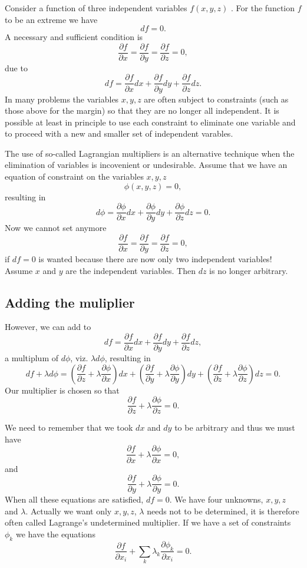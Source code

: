 \documentclass[%
oneside,                 %
final,                   %
10pt]{article}
\begin{document}
Consider a function of three independent variables $f(x,y,z)$ . For the function $f$ to be an
extreme we have
\[
df=0.
\]
A necessary and sufficient condition is
\[
\frac{\partial f}{\partial x} =\frac{\partial f}{\partial y}=\frac{\partial f}{\partial z}=0,
\]
due to
\[
df = \frac{\partial f}{\partial x}dx+\frac{\partial f}{\partial y}dy+\frac{\partial f}{\partial z}dz.
\]
In many problems the variables $x,y,z$ are often subject to constraints (such as those above for the margin)
so that they are no longer all independent. It is possible at least in principle to use each 
constraint to eliminate one variable
and to proceed with a new and smaller set of independent varables.

The use of so-called Lagrangian  multipliers is an alternative technique  when the elimination
of variables is incovenient or undesirable.  Assume that we have an equation of constraint on 
the variables $x,y,z$
\[
\phi(x,y,z) = 0,
\]
 resulting in
\[
d\phi = \frac{\partial \phi}{\partial x}dx+\frac{\partial \phi}{\partial y}dy+\frac{\partial \phi}{\partial z}dz =0.
\]
Now we cannot set anymore
\[
\frac{\partial f}{\partial x} =\frac{\partial f}{\partial y}=\frac{\partial f}{\partial z}=0,
\]
if $df=0$ is wanted
because there are now only two independent variables!  Assume $x$ and $y$ are the independent 
variables.
Then $dz$ is no longer arbitrary.

\subsection{Adding the muliplier}

However, we can add to
\[
df = \frac{\partial f}{\partial x}dx+\frac{\partial f}{\partial y}dy+\frac{\partial f}{\partial z}dz,
\]
a multiplum of $d\phi$, viz. $\lambda d\phi$, resulting  in
\[
df+\lambda d\phi = (\frac{\partial f}{\partial z}+\lambda
\frac{\partial \phi}{\partial x})dx+(\frac{\partial f}{\partial y}+\lambda\frac{\partial \phi}{\partial y})dy+
(\frac{\partial f}{\partial z}+\lambda\frac{\partial \phi}{\partial z})dz =0.
\]
Our multiplier is chosen so that
\[
\frac{\partial f}{\partial z}+\lambda\frac{\partial \phi}{\partial z} =0.
\]

We need to remember that we took $dx$ and $dy$ to be arbitrary and thus we must have
\[
\frac{\partial f}{\partial x}+\lambda\frac{\partial \phi}{\partial x} =0,
\]
and
\[
\frac{\partial f}{\partial y}+\lambda\frac{\partial \phi}{\partial y} =0.
\]
When all these equations are satisfied, $df=0$.  We have four unknowns, $x,y,z$ and
$\lambda$. Actually we want only $x,y,z$, $\lambda$ needs not to be determined, 
it is therefore often called
Lagrange's undetermined multiplier.
If we have a set of constraints $\phi_k$ we have the equations
\[
\frac{\partial f}{\partial x_i}+\sum_k\lambda_k\frac{\partial \phi_k}{\partial x_i} =0.
\]
\end{document}
